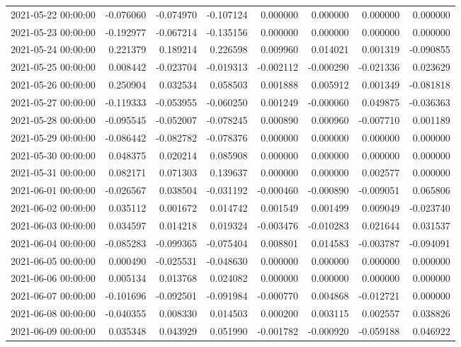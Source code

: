 \begin{tabular}{lrrrrrrr}
2021-05-22 00:00:00 & -0.076060 & -0.074970 & -0.107124 & 0.000000 & 0.000000 & 0.000000 & 0.000000 \\
2021-05-23 00:00:00 & -0.192977 & -0.067214 & -0.135156 & 0.000000 & 0.000000 & 0.000000 & 0.000000 \\
2021-05-24 00:00:00 & 0.221379 & 0.189214 & 0.226598 & 0.009960 & 0.014021 & 0.001319 & -0.090855 \\
2021-05-25 00:00:00 & 0.008442 & -0.023704 & -0.019313 & -0.002112 & -0.000290 & -0.021336 & 0.023629 \\
2021-05-26 00:00:00 & 0.250904 & 0.032534 & 0.058503 & 0.001888 & 0.005912 & 0.001349 & -0.081818 \\
2021-05-27 00:00:00 & -0.119333 & -0.053955 & -0.060250 & 0.001249 & -0.000060 & 0.049875 & -0.036363 \\
2021-05-28 00:00:00 & -0.095545 & -0.052007 & -0.078245 & 0.000890 & 0.000960 & -0.007710 & 0.001189 \\
2021-05-29 00:00:00 & -0.086442 & -0.082782 & -0.078376 & 0.000000 & 0.000000 & 0.000000 & 0.000000 \\
2021-05-30 00:00:00 & 0.048375 & 0.020214 & 0.085908 & 0.000000 & 0.000000 & 0.000000 & 0.000000 \\
2021-05-31 00:00:00 & 0.082171 & 0.071303 & 0.139637 & 0.000000 & 0.000000 & 0.002577 & 0.000000 \\
2021-06-01 00:00:00 & -0.026567 & 0.038504 & -0.031192 & -0.000460 & -0.000890 & -0.009051 & 0.065806 \\
2021-06-02 00:00:00 & 0.035112 & 0.001672 & 0.014742 & 0.001549 & 0.001499 & 0.009049 & -0.023740 \\
2021-06-03 00:00:00 & 0.034597 & 0.014218 & 0.019324 & -0.003476 & -0.010283 & 0.021644 & 0.031537 \\
2021-06-04 00:00:00 & -0.085283 & -0.099365 & -0.075404 & 0.008801 & 0.014583 & -0.003787 & -0.094091 \\
2021-06-05 00:00:00 & 0.000490 & -0.025531 & -0.048630 & 0.000000 & 0.000000 & 0.000000 & 0.000000 \\
2021-06-06 00:00:00 & 0.005134 & 0.013768 & 0.024082 & 0.000000 & 0.000000 & 0.000000 & 0.000000 \\
2021-06-07 00:00:00 & -0.101696 & -0.092501 & -0.091984 & -0.000770 & 0.004868 & -0.012721 & 0.000000 \\
2021-06-08 00:00:00 & -0.040355 & 0.008330 & 0.014503 & 0.000200 & 0.003115 & 0.002557 & 0.038826 \\
2021-06-09 00:00:00 & 0.035348 & 0.043929 & 0.051990 & -0.001782 & -0.000920 & -0.059188 & 0.046922 \\

\end{tabular}
